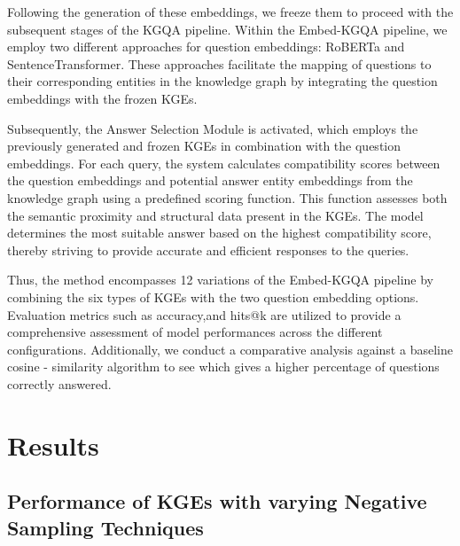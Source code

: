 \documentclass[12pt]{article}
\begin{document}
Following the generation of these embeddings, we freeze them to proceed with the subsequent stages of the KGQA pipeline. Within the Embed-KGQA pipeline, we employ two different approaches for question embeddings: RoBERTa and SentenceTransformer. These approaches facilitate the mapping of questions to their corresponding entities in the knowledge graph by integrating the question embeddings with the frozen KGEs.

Subsequently, the Answer Selection Module is activated, which employs the previously generated and frozen KGEs in combination with the question embeddings. For each query, the system calculates compatibility scores between the question embeddings and potential answer entity embeddings from the knowledge graph using a predefined scoring function. This function assesses both the semantic proximity and structural data present in the KGEs. The model determines the most suitable answer based on the highest compatibility score, thereby striving to provide accurate and efficient responses to the queries.

Thus, the method encompasses 12 variations of the Embed-KGQA pipeline by combining the six types of KGEs with the two question embedding options. Evaluation metrics such as accuracy,and hits@k are utilized to provide a comprehensive assessment of model performances across the different configurations. Additionally, we conduct a comparative analysis against a baseline cosine - similarity algorithm to see which gives a higher percentage of questions correctly answered.

\section{Results}

\subsection{Performance of KGEs with varying Negative Sampling Techniques}
\end{document}
